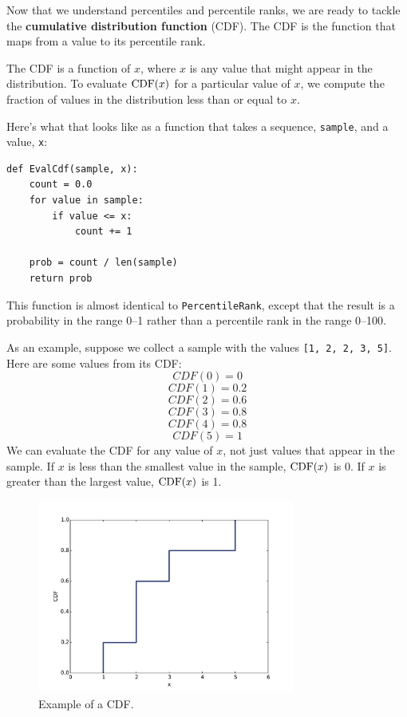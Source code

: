 \documentclass[12pt]{book}
\begin{document}
Now that we understand percentiles and percentile ranks,
we are ready to tackle the {\bf cumulative distribution function}
(CDF).  The CDF is the function that maps from a value to its
percentile rank.

The CDF is a function of $x$, where $x$ is any value that might appear
in the distribution.  To evaluate $\mathrm{CDF}(x)$ for a particular value of
$x$, we compute the fraction of values in the distribution less
than or equal to $x$.

Here's what that looks like as a function that takes a sequence,
{\tt sample}, and a value, {\tt x}:
%
\begin{verbatim}
def EvalCdf(sample, x):
    count = 0.0
    for value in sample:
        if value <= x:
            count += 1

    prob = count / len(sample)
    return prob
\end{verbatim}

This function is almost identical to {\tt PercentileRank}, except that
the result is a probability in the range 0--1 rather than a
percentile rank in the range 0--100.

As an example, suppose we collect a sample with the values 
{\tt [1, 2, 2, 3, 5]}.  Here are some values from its CDF:
%
\[ CDF(0) = 0 \]
%
\[ CDF(1) = 0.2\]
%
\[ CDF(2) = 0.6\]
%
\[ CDF(3) = 0.8\]
%
\[ CDF(4) = 0.8\]
%
\[ CDF(5) = 1\]
%
We can evaluate the CDF for any value of $x$, not just
values that appear in the sample.
If $x$ is less than the smallest value in the sample, $\mathrm{CDF}(x)$ is 0.
If $x$ is greater than the largest value, $\mathrm{CDF}(x)$ is 1.

\begin{figure}
\centerline{\includegraphics[height=2.5in]{figs/cumulative_example_cdf.pdf}}
\caption{Example of a CDF.}
\label{example_cdf}
\end{figure}
\end{document}

